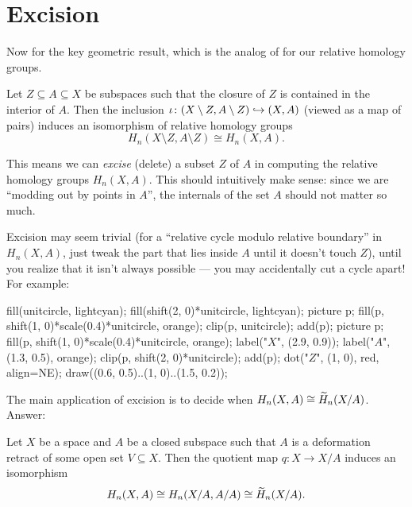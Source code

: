 \section{Excision}
Now for the key geometric result, which is the analog of
 for our relative homology groups.
\begin{theorem}
	[Excision]
	Let $Z \subseteq A \subseteq X$ be subspaces such that
	the closure of $Z$ is contained in the interior of $A$.
	Then the inclusion $\iota \colon (X \setminus Z, A \setminus Z) \hookrightarrow (X,A)$
	(viewed as a map of pairs) induces an isomorphism of
	relative homology groups
	\[ H_n(X \setminus Z, A \setminus Z) \cong H_n(X,A). \]
\end{theorem}
This means we can \emph{excise} (delete) a subset $Z$ of $A$ in computing
the relative homology groups $H_n(X,A)$.
This should intuitively make sense:
since we are ``modding out by points in $A$'',
the internals of the set $A$ should not matter so much.

\begin{example}
	Excision may seem trivial (for a ``relative cycle modulo relative boundary'' in $H_n(X, A)$,
	just tweak the part that
	lies inside $A$ until it doesn't touch $Z$), until you realize that it isn't always possible ---
	you may accidentally cut a cycle apart! For example:
	\begin{center}
	\begin{asy}
		fill(unitcircle, lightcyan);
		fill(shift(2, 0)*unitcircle, lightcyan);
		picture p;
		fill(p, shift(1, 0)*scale(0.4)*unitcircle, orange);
		clip(p, unitcircle);
		add(p);
		picture p;
		fill(p, shift(1, 0)*scale(0.4)*unitcircle, orange);
		label("$X$", (2.9, 0.9));
		label("$A$", (1.3, 0.5), orange);
		clip(p, shift(2, 0)*unitcircle);
		add(p);
		dot("$Z$", (1, 0), red, align=NE);
		draw((0.6, 0.5)..(1, 0)..(1.5, 0.2));
	\end{asy}
	\end{center}
\end{example}

The main application of excision is to decide
when $H_n(X,A) \cong \widetilde H_n(X/A)$.
Answer:

\begin{theorem}
	\label{thm:good_pair}
	Let $X$ be a space and $A$ be a closed subspace such that
	$A$ is a deformation retract of some open set $V \subseteq X$.
	Then the quotient map $q \colon X \to X/A$ induces an isomorphism
	\[ H_n(X,A) \cong H_n(X/A, A/A) \cong \widetilde H_n(X/A). \]
\end{theorem}

